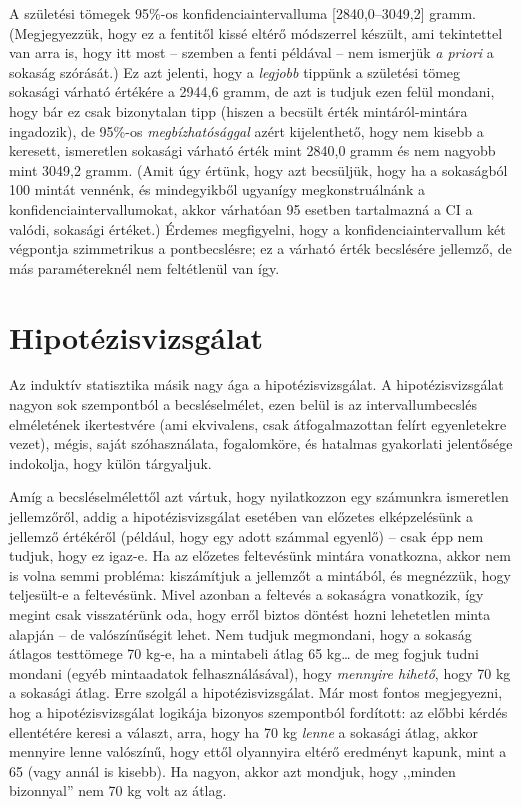 \documentclass[]{book}
\begin{document}
A születési tömegek 95\%-os konfidenciaintervalluma {[}2840,0--3049,2{]}
gramm. (Megjegyezzük, hogy ez a fentitől kissé eltérő módszerrel
készült, ami tekintettel van arra is, hogy itt most -- szemben a fenti
példával -- nem ismerjük \emph{a priori} a sokaság szórását.) Ez azt
jelenti, hogy a \emph{legjobb} tippünk a születési tömeg sokasági
várható értékére a 2944,6 gramm, de azt is tudjuk ezen felül mondani,
hogy bár ez csak bizonytalan tipp (hiszen a becsült érték
mintáról-mintára ingadozik), de 95\%-os \emph{megbízhatósággal} azért
kijelenthető, hogy nem kisebb a keresett, ismeretlen sokasági várható
érték mint 2840,0 gramm és nem nagyobb mint 3049,2 gramm. (Amit úgy
értünk, hogy azt becsüljük, hogy ha a sokaságból 100 mintát vennénk, és
mindegyikből ugyanígy megkonstruálnánk a konfidenciaintervallumokat,
akkor várhatóan 95 esetben tartalmazná a CI a valódi, sokasági értéket.)
Érdemes megfigyelni, hogy a konfidenciaintervallum két végpontja
szimmetrikus a pontbecslésre; ez a várható érték becslésére jellemző, de
más paramétereknél nem feltétlenül van így.

\section{Hipotézisvizsgálat}\label{induktivhipotezisvizsgalat}

Az induktív statisztika másik nagy ága a hipotézisvizsgálat. A
hipotézisvizsgálat nagyon sok szempontból a becsléselmélet, ezen belül
is az intervallumbecslés elméletének ikertestvére (ami ekvivalens, csak
átfogalmazottan felírt egyenletekre vezet), mégis, saját szóhasználata,
fogalomköre, és hatalmas gyakorlati jelentősége indokolja, hogy külön
tárgyaljuk.

Amíg a becsléselmélettől azt vártuk, hogy nyilatkozzon egy számunkra
ismeretlen jellemzőről, addig a hipotézisvizsgálat esetében van előzetes
elképzelésünk a jellemző értékéről (például, hogy egy adott számmal
egyenlő) -- csak épp nem tudjuk, hogy ez igaz-e. Ha az előzetes
feltevésünk mintára vonatkozna, akkor nem is volna semmi probléma:
kiszámítjuk a jellemzőt a mintából, és megnézzük, hogy teljesült-e a
feltevésünk. Mivel azonban a feltevés a sokaságra vonatkozik, így megint
csak visszatérünk oda, hogy erről biztos döntést hozni lehetetlen minta
alapján -- de valószínűségit lehet. Nem tudjuk megmondani, hogy a
sokaság átlagos testtömege 70 kg-e, ha a mintabeli átlag 65 kg\dots{} de
meg fogjuk tudni mondani (egyéb mintaadatok felhasználásával), hogy
\emph{mennyire hihető}, hogy 70 kg a sokasági átlag. Erre szolgál a
hipotézisvizsgálat. Már most fontos megjegyezni, hog a
hipotézisvizsgálat logikája bizonyos szempontból fordított: az előbbi
kérdés ellentétére keresi a választ, arra, hogy ha 70 kg \emph{lenne} a
sokasági átlag, akkor mennyire lenne valószínű, hogy ettől olyannyira
eltérő eredményt kapunk, mint a 65 (vagy annál is kisebb). Ha nagyon,
akkor azt mondjuk, hogy ,,minden bizonnyal'' nem 70 kg volt az átlag.
\end{document}
